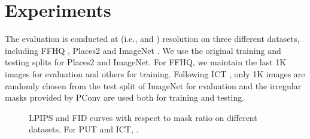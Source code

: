 \documentclass[10pt,twocolumn,letterpaper]{article}
\begin{document}
\section{Experiments}
\label{sec: experiments}
The evaluation is conducted at  (i.e.,  and ) resolution on three different datasets, including FFHQ \cite{karras2019style}, Places2 \cite{zhou2017places} and ImageNet \cite{deng2009imagenet}. We use the original training and testing splits for Places2 and ImageNet. For FFHQ, we maintain the last 1K images for evaluation and others for training. Following ICT \cite{wan2021high}, only 1K images are randomly chosen from the test split of ImageNet for evaluation and the irregular masks provided by PConv \cite{liu2018image} are used both for training and testing.


\begin{figure}[t]\centering


	\centering
	\caption{LPIPS and FID curves with respect to mask ratio on different datasets. For PUT and ICT, .}
	\vspace{-10pt}
	\label{fig: lpips_and_fid}
\end{figure}
\end{document}
